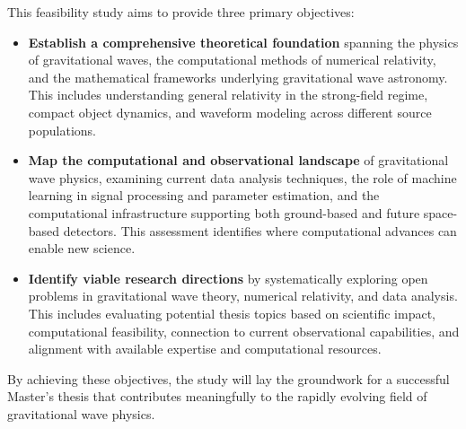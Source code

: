 This feasibility study aims to provide three primary objectives:
\begin{itemize}
    \item \textbf{Establish a comprehensive theoretical foundation} spanning the physics of gravitational waves, the computational methods of numerical relativity, and the mathematical frameworks underlying gravitational wave astronomy.
    This includes understanding general relativity in the strong-field regime, compact object dynamics, and waveform modeling across different source populations.

    \item \textbf{Map the computational and observational landscape} of gravitational wave physics, examining current data analysis techniques, the role of machine learning in signal processing and parameter estimation, and the computational infrastructure supporting both ground-based and future space-based detectors.
    This assessment identifies where computational advances can enable new science.

    \item \textbf{Identify viable research directions} by systematically exploring open problems in gravitational wave theory, numerical relativity, and data analysis.
    This includes evaluating potential thesis topics based on scientific impact, computational feasibility, connection to current observational capabilities, and alignment with available expertise and computational resources.
\end{itemize}

By achieving these objectives, the study will lay the groundwork for a successful Master's thesis that contributes meaningfully to the rapidly evolving field of gravitational wave physics.

